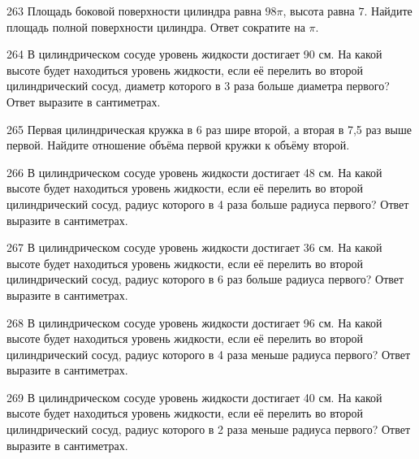 \documentclass[4apaper]{article}
\begin{document}
\begin{taskBN}{263}
Площадь боковой поверхности цилиндра равна $98\pi$, высота равна $7$. Найдите площадь полной поверхности цилиндра. Ответ сократите на $\pi$.
\end{taskBN}

\begin{taskBN}{264}
В цилиндрическом сосуде уровень жидкости достигает 90 см. На какой высоте будет находиться уровень жидкости, если её перелить во второй цилиндрический сосуд, диаметр которого в 3 раза больше диаметра первого? Ответ выразите в сантиметрах.
\end{taskBN}

\begin{taskBN}{265}
 Первая цилиндрическая кружка в 6 раз шире второй, а вторая в 7,5 раз выше первой. Найдите отношение объёма первой кружки к объёму второй.
\end{taskBN}

\begin{taskBN}{266}
В цилиндрическом сосуде уровень жидкости достигает 48 см. На какой высоте будет находиться уровень жидкости, если её перелить во второй цилиндрический сосуд, радиус которого в 4 раза больше радиуса первого? Ответ выразите в сантиметрах.
\end{taskBN}

\begin{taskBN}{267}
В цилиндрическом сосуде уровень жидкости достигает 36 см. На какой высоте будет находиться уровень жидкости, если её перелить во второй цилиндрический сосуд, радиус которого в 6 раз больше радиуса первого? Ответ выразите в сантиметрах.
\end{taskBN}

\begin{taskBN}{268}
В цилиндрическом сосуде уровень жидкости достигает 96 см. На какой высоте будет находиться уровень жидкости, если её перелить во второй цилиндрический сосуд, радиус которого в 4 раза меньше радиуса первого? Ответ выразите в сантиметрах.
\end{taskBN}

\begin{taskBN}{269}
В цилиндрическом сосуде уровень жидкости достигает 40 см. На какой высоте будет находиться уровень жидкости, если её перелить во второй цилиндрический сосуд, радиус которого в 2 раза меньше радиуса первого? Ответ выразите в сантиметрах.
\end{taskBN}
\end{document}
